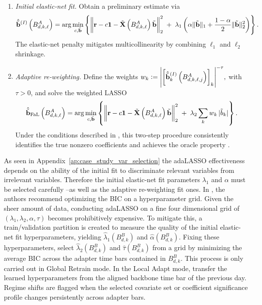 \documentclass[10pt,a4paper,oneside]{article}
\DeclarePairedDelimiter{\norma}{\lVert}{\rVert} %
\DeclarePairedDelimiter{\aval}{\lvert}{\rvert} %
\begin{document}
\begin{enumerate}[label=(\roman*)]
    \item \emph{Initial elastic‐net fit.}  Obtain a preliminary estimate via
          \[
              \hat{\tilde{\mathbf{b}}}^{(I)} \left( B^A_{d, k, \ell} \right)
              = \arg\min_{c, \tilde{\mathbf{b}}} \left\{
              \norma*{\mathbf{r} - c \mathbf{1} - \tilde{\mathbf{X}} \left( B^A_{d, k, \ell}\right)\tilde{\mathbf{b}}}_2^2
              \;+\;\lambda_1\left(\alpha\|\tilde{\mathbf{b}}\|_1 + \frac{1-\alpha}{2} \|\tilde{\mathbf{b}}\|_2^2\right) \right\}.
          \]
          The elastic‐net penalty mitigates multicollinearity by combining \(\ell_1\) and \(\ell_2\) shrinkage.

    \item \emph{Adaptive re‐weighting.}  Define the weights
          \(
          w_k := \aval*{\left[\hat{\tilde{\mathbf{b}}}_k^{(I)}\left( B^A_{d, k, \ell, j} \right) \right]_{k}}^{-\tau},
          \)
          with \(\tau>0\), and solve the weighted LASSO
          \[
              \hat{\tilde{\mathbf{b}}}_{\mathrm{FaL}} \left( B^A_{d, k, \ell} \right)
              = \arg\min_{c, \tilde{\mathbf{b}}} \left\{
              \norma*{\mathbf{r} - c \mathbf{1} -  \tilde{\mathbf{X}} \left( B^A_{d, k, \ell}\right)\tilde{\mathbf{b}}}_2^2
              \;+\;\lambda_2\sum_{k} w_k\,|\tilde b_k| \right\}.
          \]
          Under the conditions described in \cite{MEDEIROS2016255}, this two‐step procedure consistently identifies the true nonzero coefficients and achieves the oracle property \cite{MEDEIROS2016255}.
\end{enumerate}

As seen in Appendix~\ref{ap:case_study_var_selection} the adaLASSO effectiveness depends on the ability of the initial fit to discriminate relevant variables from irrelevant variables. Therefore the initial elastic-net fit parameters \(\lambda_1\) and \(\alpha\) must be selected carefully --as well as the adaptive re-weighting fit ones. In \cite{MEDEIROS2016255}, the authors recommend optimizing the BIC on a hyperparameter grid. Given the sheer amount of data, conducting adaLASSO on a fine four dimensional grid of \((\lambda_1, \lambda_2, \alpha, \tau)\) becomes prohibitively expensive. To mitigate this, a train/validation partition is created to measure the quality of the initial elastic-net fit hyperparameters, yielding  \(\hat{\lambda}_1 \left( B^B_{d, k} \right)\) and \(\hat{\alpha}\left( B^B_{d, k} \right)\). Fixing these hyperparameters, select \(\hat{\lambda}_2\left( B^B_{d, k} \right)\) and \(\hat{\tau}\left( B^B_{d,k} \right)\) from a grid by minimizing the average BIC across the adapter time bars contained in \(B^B_{d,k}\). This process is only carried out in Global Retrain mode. In the Local Adapt mode, transfer the learned hyperparameters from the aligned backbone time bar of the previous day. Regime shifts are flagged when the selected covariate set or coefficient significance profile changes persistently across adapter bars.
\end{document}
